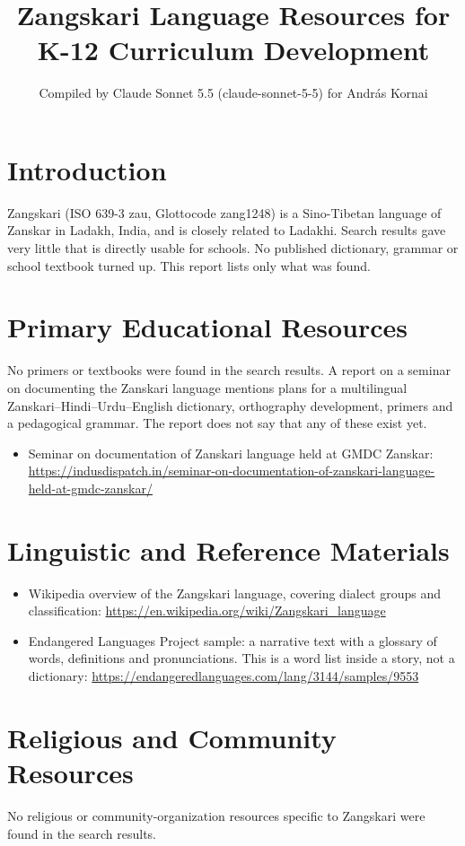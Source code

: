\documentclass[12pt]{article}
\title{Zangskari Language Resources for K-12 Curriculum Development}
\author{Compiled by Claude Sonnet 5.5 (claude-sonnet-5-5) for Andr\'as Kornai}
\date{}
\begin{document}
\maketitle

\section{Introduction}
Zangskari (ISO 639-3 zau, Glottocode zang1248) is a Sino-Tibetan language of Zanskar in Ladakh, India, and is closely related to Ladakhi. Search results gave very little that is directly usable for schools. No published dictionary, grammar or school textbook turned up. This report lists only what was found.

\section{Primary Educational Resources}
No primers or textbooks were found in the search results.
A report on a seminar on documenting the Zanskari language mentions plans for a multilingual Zanskari--Hindi--Urdu--English dictionary, orthography development, primers and a pedagogical grammar. The report does not say that any of these exist yet.
\begin{itemize}
\item Seminar on documentation of Zanskari language held at GMDC Zanskar: \url{https://indusdispatch.in/seminar-on-documentation-of-zanskari-language-held-at-gmdc-zanskar/}
\end{itemize}

\section{Linguistic and Reference Materials}
\begin{itemize}
\item Wikipedia overview of the Zangskari language, covering dialect groups and classification: \url{https://en.wikipedia.org/wiki/Zangskari_language}
\item Endangered Languages Project sample: a narrative text with a glossary of words, definitions and pronunciations. This is a word list inside a story, not a dictionary: \url{https://endangeredlanguages.com/lang/3144/samples/9553}
\end{itemize}

\section{Religious and Community Resources}
No religious or community-organization resources specific to Zangskari were found in the search results.
\end{document}
